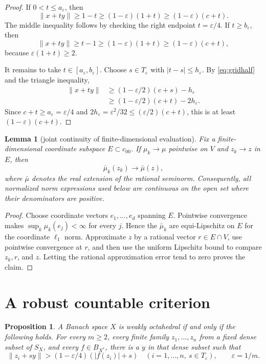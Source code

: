\documentclass[11pt]{article}
\newtheorem{lemma}[theorem]{Lemma}
\newtheorem{proposition}[theorem]{Proposition}
\newcommand{\norm}[1]{\lVert#1\rVert}
\newcommand{\abs}[1]{\lvert#1\rvert}
\begin{document}
\begin{proof}
If $0<t\leq a_\varepsilon$, then
\[
 \norm{x+t y}\geq1-t
 \geq(1-\varepsilon)(1+t)
 \geq(1-\varepsilon)(c+t).
\]
The middle inequality follows by checking the right endpoint
$t=\varepsilon/4$.  If $t\geq b_\varepsilon$, then
\[
 \norm{x+t y}\geq t-1
 \geq(1-\varepsilon)(1+t)
 \geq(1-\varepsilon)(c+t),
\]
because $\varepsilon(1+t)\geq2$.

It remains to take $t\in[a_\varepsilon,b_\varepsilon]$.  Choose
$s\in T_\varepsilon$ with $\abs{t-s}\leq h_\varepsilon$.  By
\eqref{eq:gridhalf} and the triangle inequality,
\begin{align*}
 \norm{x+t y}
 &\geq (1-\varepsilon/2)(c+s)-h_\varepsilon\\
 &\geq (1-\varepsilon/2)(c+t)-2h_\varepsilon.
\end{align*}
Since $c+t\geq a_\varepsilon=\varepsilon/4$ and
$2h_\varepsilon=\varepsilon^2/32\leq
(\varepsilon/2)(c+t)$, this is at least
$(1-\varepsilon)(c+t)$.
\end{proof}

\begin{lemma}[joint continuity of finite-dimensional evaluation]
\label{lem:continuity}
Fix a finite-dimensional coordinate subspace $E\subset c_{00}$.  If
$\mu_k\to\mu$ pointwise on $V$ and $z_k\to z$ in $E$, then
\[
 \bar\mu_k(z_k)\longrightarrow\bar\mu(z),
\]
where $\bar\mu$ denotes the real extension of the rational seminorm.
Consequently, all normalized norm expressions used below are continuous on
the open set where their denominators are positive.
\end{lemma}

\begin{proof}
Choose coordinate vectors $e_1,\ldots,e_d$ spanning $E$.  Pointwise
convergence makes $\sup_k\mu_k(e_j)<\infty$ for every $j$.  Hence the
$\bar\mu_k$ are equi-Lipschitz on $E$ for the coordinate $\ell_1$ norm.
Approximate $z$ by a rational vector $r\in E\cap V$, use pointwise
convergence at $r$, and then use the uniform Lipschitz bound to compare
$z_k,r$, and $z$.  Letting the rational approximation error tend to zero
proves the claim.
\end{proof}

\section{A robust countable criterion}

\begin{proposition}\label{prop:criterion}
A Banach space $X$ is weakly octahedral if and only if the following holds.
For every $m\geq2$, every finite family $z_1,\ldots,z_n$ from a fixed dense
subset of $S_X$, and every $f\in B_{X^*}$, there is a $y$ in that dense
subset such that
\begin{equation}\label{eq:criterion}
 \norm{z_i+s y}>
 (1-\varepsilon/4)(\abs{f(z_i)}+s)
 \quad(i=1,\ldots,n,\ s\in T_\varepsilon),
 \qquad \varepsilon=1/m.
\end{equation}
\end{proposition}
\end{document}
